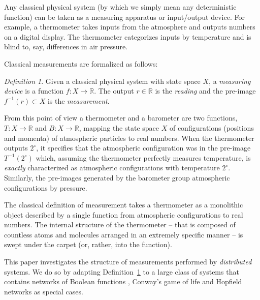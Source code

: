 \documentclass[12pt]{article}
\newcommand{\bR}{{\mathbb R}}
\theoremstyle{remark}
\newtheorem{defn}{Definition}
\begin{document}
Any classical physical system (by which we simply mean any deterministic 
function) can be taken as a measuring apparatus or input/output device. 
For example, a thermometer takes inputs from the atmosphere and outputs 
numbers on a digital display. The thermometer categorizes inputs by 
temperature and is blind to, say, differences in air pressure. 

Classical measurements are formalized as follows:
\begin{defn}
    \label{d:cmeasure}
	Given a classical physical system with state space $X$, a 
    \emph{measuring device} is a function $f:X\rightarrow \bR$. 
    The output $r \in \bR$ is the \emph{reading} and the pre-image 
    $f^{-1}(r)\subset X$ is the \emph{measurement}.
\end{defn}

From this point of view a thermometer and a barometer are two functions, 
$T: X\rightarrow \bR$ and $B: X\rightarrow \bR$, mapping the state space 
$X$ of configurations (positions and momenta) of atmospheric particles 
to real numbers. When the thermometer outputs $2^\circ$, it specifies that 
the atmospheric configuration was in the pre-image $T^{-1}(2^\circ)$ which, 
assuming the thermometer perfectly measures temperature, is \emph{exactly}
characterized as atmospheric configurations with temperature $2^\circ$. 
Similarly, the pre-images generated by the barometer group atmospheric 
configurations by pressure.

The classical definition of measurement takes a thermometer as a monolithic 
object described by a single function from atmospheric configurations to 
real numbers. The internal structure of the thermometer -- that is composed
of countless atoms and molecules arranged in an extremely specific manner 
-- is swept under the carpet (or, rather, into the function).

This paper investigates the structure of measurements performed by 
\emph{distributed} systems. We do so by adapting Definition~\ref{d:cmeasure}
to a large class of systems that contains networks of Boolean functions 
\cite{Kauffman:2003fv}, Conway's game of life \cite{gardner:70, berlekamp:82}
and Hopfield networks \cite{hopfield:82, amit:89} as special cases.
\end{document}
